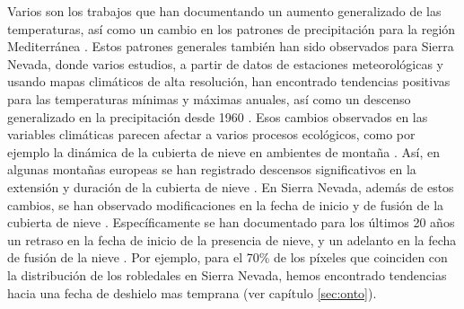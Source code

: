 Varios son los trabajos que han documentando un aumento generalizado de las temperaturas, así como un cambio en los patrones de precipitación para la región Mediterránea \autocites[\emph{e.g.}][]{PerezBoscolo2010ClimateSpain,GarciaRuizetal2011MediterraneanWater,GiorgiLionello2008ClimateChange,Crameretal2020ClimateEnvironmental}. Estos patrones generales también han sido observados para Sierra Nevada, donde varios estudios, a partir de datos de estaciones meteorológicas y usando mapas climáticos de alta resolución, han encontrado tendencias positivas para las temperaturas mínimas y máximas anuales, así como un descenso generalizado en la precipitación desde 1960 \autocite{Benitoetal2014ClimateSimulations,PerezLuqueetal2016SenalesCambio,PerezLuqueetal2021ClimaNevadaBase,PerezPalazonetal2015ExtremeValues}. Esos cambios observados en las variables climáticas parecen afectar a varios procesos ecológicos, como por ejemplo la dinámica de la cubierta de nieve en ambientes de montaña \autocite{Trujilloetal2012ElevationdependentInfluence}. Así, en algunas montañas europeas se han registrado descensos significativos en la extensión y duración de la cubierta de nieve \autocite{Marty2008RegimeShift,MorenoRodriguezetal2005EvaluacionPreliminar,Nikolovaetal2013ChangesSnowfall,Scherreretal2004TrendsSwiss}. En Sierra Nevada, además de estos cambios, se han observado modificaciones en la fecha de inicio y de fusión de la cubierta de nieve \autocites{PerezLuqueetal2016SenalesCambio}. Específicamente se han documentado para los últimos 20 años un retraso en la fecha de inicio de la presencia de nieve, y un adelanto en la fecha de fusión de la nieve \autocites{PerezLuqueetal2016SenalesCambio}. Por ejemplo, para el 70\% de los píxeles que coinciden con la distribución de los robledales en Sierra Nevada, hemos encontrado tendencias hacia una fecha de deshielo mas temprana (ver capítulo \ref{sec:onto}). 

